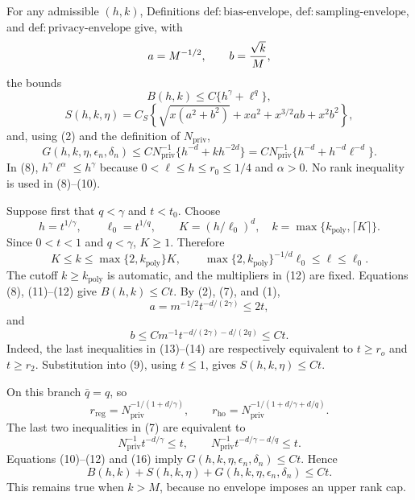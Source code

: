 For any admissible \((h,k)\), Definitions \(\mathrm{def{:}bias\text{-}envelope}\), \(\mathrm{def{:}sampling\text{-}envelope}\), and \(\mathrm{def{:}privacy\text{-}envelope}\) give, with
\[
 a=M^{-1/2},\qquad b={\sqrt{k}\over M},
\]
the bounds
\[
 B(h,k)\le C\{h^\gamma+\ell^q\},
\tag{8}
\]
\[
 S(h,k,\eta)=C_S\left\{
 \sqrt{x(a^2+b^2)}+xa^2+x^{3/2}ab+x^2b^2
 \right\},
\tag{9}
\]
and, using (2) and the definition of \(N_{\mathrm{priv}}\),
\[
 G(h,k,\eta,\epsilon_n,\delta_n)
 \le C N_{\mathrm{priv}}^{-1}\{h^{-d}+kh^{-2d}\}
 =C N_{\mathrm{priv}}^{-1}\{h^{-d}+h^{-d}\ell^{-d}\}.
\tag{10}
\]
In (8), \(h^\gamma\ell^\alpha\le h^\gamma\) because \(0<\ell\le h\le r_0\le1/4\) and \(\alpha>0\).  No rank inequality is used in (8)--(10).

Suppose first that \(q<\gamma\) and \(t<t_0\).  Choose
\[
 h=t^{1/\gamma},\qquad \ell_0=t^{1/q},
 \qquad K=(h/\ell_0)^d,\quad
 k=\max\{k_{\mathrm{poly}},\lceil K\rceil\}.
\tag{11}
\]
Since \(0<t<1\) and \(q<\gamma\), \(K\ge1\).  Therefore
\[
 K\le k\le \max\{2,k_{\mathrm{poly}}\}K,
 \qquad
 \max\{2,k_{\mathrm{poly}}\}^{-1/d}\ell_0
 \le\ell\le\ell_0.
\tag{12}
\]
The cutoff \(k\ge k_{\mathrm{poly}}\) is automatic, and the multipliers in (12) are fixed.  Equations (8), (11)--(12) give \(B(h,k)\le Ct\).  By (2), (7), and (1),
\[
 a=m^{-1/2}t^{-d/(2\gamma)}\le2t,
\tag{13}
\]
and
\[
 b\le C m^{-1}t^{-d/(2\gamma)-d/(2q)}\le Ct.
\tag{14}
\]
Indeed, the last inequalities in (13)--(14) are respectively equivalent to \(t\ge r_o\) and \(t\ge r_2\).  Substitution into (9), using \(t\le1\), gives \(S(h,k,\eta)\le Ct\).

On this branch \(\bar q=q\), so
\[
 r_{\mathrm{reg}}=N_{\mathrm{priv}}^{-1/(1+d/\gamma)},
 \qquad
 r_{\mathrm{ho}}=N_{\mathrm{priv}}^{-1/(1+d/\gamma+d/q)}.
\tag{15}
\]
The last two inequalities in (7) are equivalent to
\[
 N_{\mathrm{priv}}^{-1}t^{-d/\gamma}\le t,
 \qquad
 N_{\mathrm{priv}}^{-1}t^{-d/\gamma-d/q}\le t.
\tag{16}
\]
Equations (10)--(12) and (16) imply \(G(h,k,\eta,\epsilon_n,\delta_n)\le Ct\).  Hence
\[
 B(h,k)+S(h,k,\eta)+G(h,k,\eta,\epsilon_n,\delta_n)\le Ct.
\tag{17}
\]
This remains true when \(k>M\), because no envelope imposes an upper rank cap.

